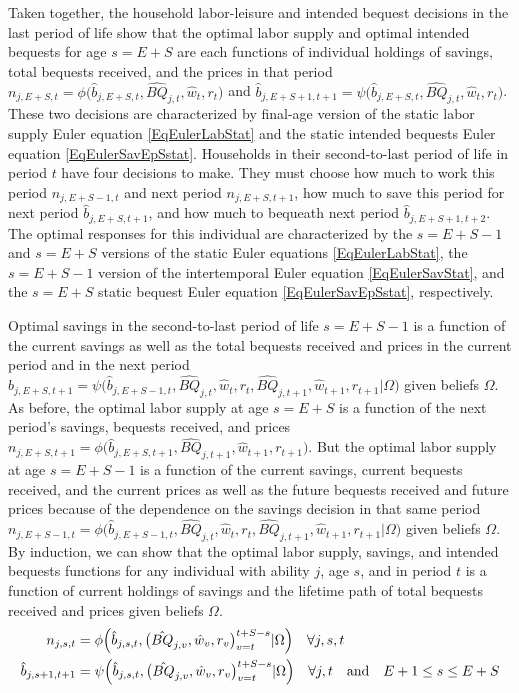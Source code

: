     \noindent Taken together, the household labor-leisure and intended bequest decisions in the last period of life show that the optimal labor supply and optimal intended bequests for age $s=E+S$ are each functions of individual holdings of savings, total bequests received, and the prices in that period $n_{j,E+S,t}=\phi\bigl(\hat{b}_{j,E+S,t},\hat{BQ}_{j,t},\hat{w}_t,r_t\bigr)$ and $\hat{b}_{j,E+S+1,t+1}=\psi\bigl(\hat{b}_{j,E+S,t},\hat{BQ}_{j,t},\hat{w}_t,r_t\bigr)$. These two decisions are characterized by final-age version of the static labor supply Euler equation \eqref{EqEulerLabStat} and the static intended bequests Euler equation \eqref{EqEulerSavEpSstat}. Households in their second-to-last period of life in period $t$ have four decisions to make. They must choose how much to work this period $n_{j,E+S-1,t}$ and next period $n_{j,E+S,t+1}$, how much to save this period for next period $\hat{b}_{j,E+S,t+1}$, and how much to bequeath next period $\hat{b}_{j,E+S+1,t+2}$. The optimal responses for this individual are characterized by the $s=E+S-1$ and $s=E+S$ versions of the static Euler equations \eqref{EqEulerLabStat}, the $s=E+S-1$ version of the intertemporal Euler equation \eqref{EqEulerSavStat}, and the $s=E+S$ static bequest Euler equation \eqref{EqEulerSavEpSstat}, respectively.

    Optimal savings in the second-to-last period of life $s=E+S-1$ is a function of the current savings as well as the total bequests received and prices in the current period and in the next period $\hat{b}_{j,E+S,t+1} = \psi\bigl(\hat{b}_{j,E+S-1,t},\hat{BQ}_{j,t},\hat{w}_t,r_t,\hat{BQ}_{j,t+1},\hat{w}_{t+1},r_{t+1}|\Omega\bigr)$ given beliefs $\Omega$. As before, the optimal labor supply at age $s=E+S$ is a function of the next period's savings, bequests received, and prices $n_{j,E+S,t+1}=\phi\bigl(\hat{b}_{j,E+S,t+1},\hat{BQ}_{j,t+1},\hat{w}_{t+1},r_{t+1}\bigr)$. But the optimal labor supply at age $s=E+S-1$ is a function of the current savings, current bequests received, and the current prices as well as the future bequests received and future prices because of the dependence on the savings decision in that same period $n_{j,E+S-1,t}=\phi\bigl(\hat{b}_{j,E+S-1,t},\hat{BQ}_{j,t},\hat{w}_t,r_t,\hat{BQ}_{j,t+1},\hat{w}_{t+1},r_{t+1}|\Omega\bigr)$ given beliefs $\Omega$. By induction, we can show that the optimal labor supply, savings, and intended bequests functions for any individual with ability $j$, age $s$, and in period $t$ is a function of current holdings of savings and the lifetime path of total bequests received and prices given beliefs $\Omega$.
    \begin{align}
      n_{j,s,t} &= \phi\Bigl(\hat{b}_{j,s,t},\bigl(\hat{BQ}_{j,v},\hat{w}_v,r_v\bigr)_{v=t}^{t+S-s}|\Omega\Bigr) \quad\forall j,s,t \label{EqLabPolFuncGen} \\
      \hat{b}_{j,s+1,t+1} &= \psi\Bigl(\hat{b}_{j,s,t},\bigl(\hat{BQ}_{j,v},\hat{w}_v,r_v\bigr)_{v=t}^{t+S-s}|\Omega\Bigr) \quad\forall j,t \quad\text{and}\quad E+1\leq s\leq E+S \label{EqSavPolFuncGen}
    \end{align}


